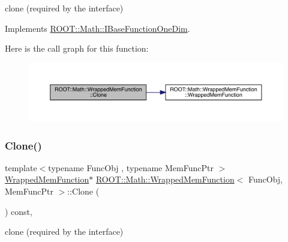 clone (required by the interface) 



Implements \mbox{\hyperlink{classROOT_1_1Math_1_1IBaseFunctionOneDim_a656dbb4dfc43e8d1566442bfb1a717fd}{R\+O\+O\+T\+::\+Math\+::\+I\+Base\+Function\+One\+Dim}}.

Here is the call graph for this function\+:
\nopagebreak
\begin{figure}[H]
\begin{center}
\leavevmode
\includegraphics[width=350pt]{dd/df6/classROOT_1_1Math_1_1WrappedMemFunction_a6f27e92240e16003ff20c25df6fba1eb_cgraph}
\end{center}
\end{figure}
\mbox{\label{classROOT_1_1Math_1_1WrappedMemFunction_a6f27e92240e16003ff20c25df6fba1eb}} 
\subsubsection{\texorpdfstring{Clone()}{Clone()}\hspace{0.1cm}{\footnotesize\ttfamily [2/3]}}
{\footnotesize\ttfamily template$<$typename Func\+Obj , typename Mem\+Func\+Ptr $>$ \\
\mbox{\hyperlink{classROOT_1_1Math_1_1WrappedMemFunction}{Wrapped\+Mem\+Function}}$\ast$ \mbox{\hyperlink{classROOT_1_1Math_1_1WrappedMemFunction}{R\+O\+O\+T\+::\+Math\+::\+Wrapped\+Mem\+Function}}$<$ Func\+Obj, Mem\+Func\+Ptr $>$\+::Clone (\begin{DoxyParamCaption}{ }\end{DoxyParamCaption}) const\hspace{0.3cm}{\ttfamily [inline]}, {\ttfamily [virtual]}}



clone (required by the interface) 



